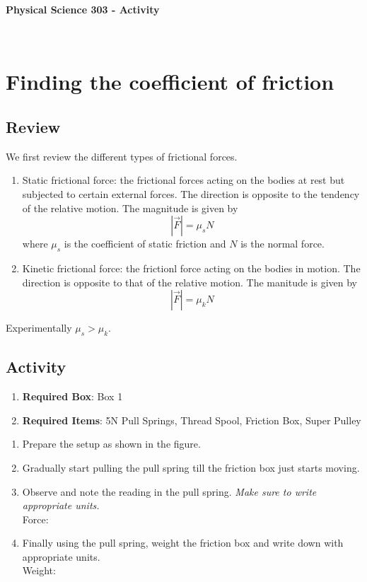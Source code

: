 \documentclass[10pt]{article}
\date{2014-6-22}
\begin{document}
\begin{center}
\begin{Large}\textbf{Physical Science 303 - Activity}\end{Large} \\
\smallskip
\end{center}

\section{Finding the coefficient of friction}
\subsection{Review}
We first review the different types of frictional forces.
\begin{enumerate}
\item Static frictional force: the frictional forces acting on the bodies at rest but subjected to certain external forces.  The direction is opposite to the tendency of the relative motion.  The magnitude is given by
  \begin{equation}
    |\vec{F}| = \mu_{s}N
  \end{equation}
where $\mu_s$ is the coefficient of static friction and $N$ is the normal force. 
\item Kinetic frictional force: the frictionl force acting on the bodies in motion.  The direction is opposite to that of the relative motion.  The manitude is given by
  \begin{equation}
    |\vec{F}| = \mu_{k}N
  \end{equation}
\end{enumerate}
Experimentally $\mu_s>\mu_k$.  
\subsection{Activity}
\begin{enumerate}
\item \textbf{Required Box}: Box 1
\item \textbf{Required Items}: 5N Pull Springs, Thread Spool, Friction Box, Super Pulley
\end{enumerate}
\begin{enumerate}
\item Prepare the setup as shown in the figure.
\item Gradually start pulling the pull spring till the friction box just starts moving.
\item Observe and note the reading in the pull spring.  \emph{Make sure to write appropriate units.}\\
Force:\underline{\hspace{5cm}}
\item Finally using the pull spring, weight the friction box and write down with appropriate units.\\  Weight:\underline{\hspace{5cm}}
\end{enumerate}
\end{document}
